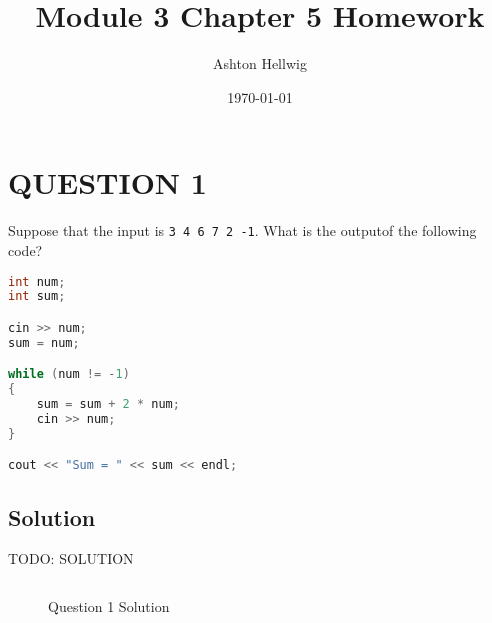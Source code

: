\documentclass[a4paper]{article}
\title{Module 3 Chapter 5 Homework}
\author{Ashton Hellwig}
\date\today
\begin{document}
    \maketitle
    \tableofcontents
    \listoffigures
    \newpage


    \section{QUESTION 1}
      Suppose that the input is \texttt{3 4 6 7 2 -1}. What is the outputof the
        following code?
      \begin{lstlisting}[language=c++]
int num;
int sum;

cin >> num;
sum = num;

while (num != -1)
{
    sum = sum + 2 * num;
    cin >> num;
}

cout << "Sum = " << sum << endl;
      \end{lstlisting}
      \subsection{Solution}
        TODO: SOLUTION
        \begin{verbatim}

        \end{verbatim}
        \begin{figure}[h]
          \caption{Question 1 Solution}
          \centering
          \label{fig:q1}
        \end{figure}


    \newpage
    \appendix
\end{document}
